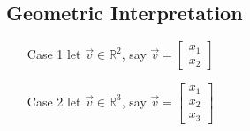\documentclass[12pt, letterpaper]{article}
\begin{document}
\subsection{Geometric Interpretation}
\begin{enumerate}
    \item[Case 1] let $\vec{v} \in \mathbb{R}^2$, say $\vec{v} = \begin{bmatrix} x_1 \\ x_2 \end{bmatrix}$
    \item[Case 2] let $\vec{v} \in \mathbb{R}^3$, say $\vec{v} = \begin{bmatrix} x_1 \\ x_2 \\ x_3 \end{bmatrix}$
\end{enumerate}
\end{document}
